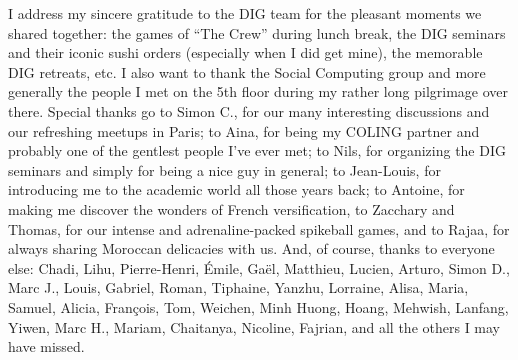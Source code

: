I address my sincere gratitude to the DIG team for the pleasant moments we shared together: the games of ``The Crew'' during lunch break, the DIG seminars and their iconic sushi orders (especially when I did get mine), the memorable DIG retreats, etc. I also want to thank the Social Computing group and more generally the people I met on the 5th floor during my rather long pilgrimage over there. Special thanks go to Simon C., for our many interesting discussions and our refreshing meetups in Paris; to Aina, for being my COLING partner and probably one of the gentlest people I've ever met; to Nils, for organizing the DIG seminars and simply for being a nice guy in general; to Jean-Louis, for introducing me to the academic world all those years back; to Antoine, for making me discover the wonders of French versification, to Zacchary and Thomas, for our intense and adrenaline-packed spikeball games, and to Rajaa, for always sharing Moroccan delicacies with us. And, of course, thanks to everyone else: Chadi, Lihu, Pierre-Henri, Émile, Gaël, Matthieu, Lucien, Arturo, Simon D., Marc J., Louis, Gabriel, Roman, Tiphaine, Yanzhu, Lorraine, Alisa, Maria, Samuel, Alicia, François, Tom, Weichen, Minh Huong, Hoang, Mehwish, Lanfang, Yiwen, Marc H., Mariam, Chaitanya, Nicoline, Fajrian, and all the others I may have missed.\\

